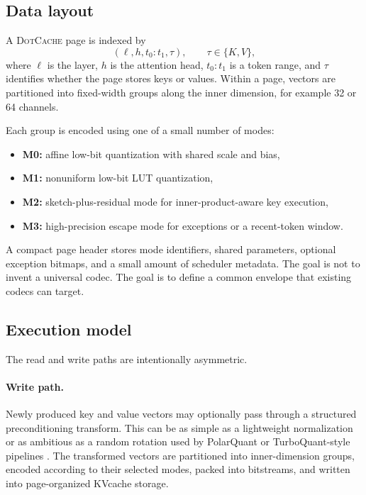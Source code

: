 \documentclass[11pt]{article}
\newcommand{\method}{\textsc{DotCache}}
\newcommand{\kv}{KV}
\newcommand{\kvc}{\kv cache}
\begin{document}
\subsection{Data layout}

A \method{} page is indexed by
\[
(\ell, h, t_0{:}t_1, \tau), \qquad \tau \in \{K, V\},
\]
where $\ell$ is the layer, $h$ is the attention head, $t_0{:}t_1$ is a token range, and $\tau$ identifies whether the page stores keys or values. Within a page, vectors are partitioned into fixed-width groups along the inner dimension, for example 32 or 64 channels.

Each group is encoded using one of a small number of modes:
\begin{itemize}
    \item \textbf{M0:} affine low-bit quantization with shared scale and bias,
    \item \textbf{M1:} nonuniform low-bit LUT quantization,
    \item \textbf{M2:} sketch-plus-residual mode for inner-product-aware key execution,
    \item \textbf{M3:} high-precision escape mode for exceptions or a recent-token window.
\end{itemize}

A compact page header stores mode identifiers, shared parameters, optional exception bitmaps, and a small amount of scheduler metadata. The goal is not to invent a universal codec. The goal is to define a common envelope that existing codecs can target.

\subsection{Execution model}

The read and write paths are intentionally asymmetric.

\paragraph{Write path.} Newly produced key and value vectors may optionally pass through a structured preconditioning transform. This can be as simple as a lightweight normalization or as ambitious as a random rotation used by PolarQuant or TurboQuant-style pipelines \cite{polarquant,turboquant}. The transformed vectors are partitioned into inner-dimension groups, encoded according to their selected modes, packed into bitstreams, and written into page-organized \kvc{} storage.
\end{document}
